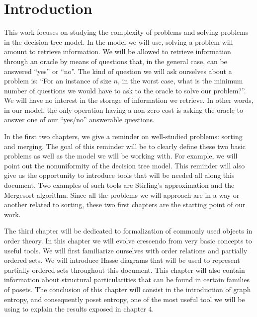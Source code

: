 \chapter*{Introduction}
%

This work focuses on studying the complexity of problems and solving problems
in the decision tree model. In the model we will use, solving a problem will
amount to retrieve information. We will be allowed to retrieve information
through an oracle by means of questions that, in the general case,
can be answered ``yes'' or ``no''. The kind of question we will ask ourselves
about a problem is: ``For an instance of size \(n\), in the worst case, what is
the minimum number of questions we would have to ask to the oracle to solve our
problem?''. We will have no interest in the storage of information we retrieve.
In other words, in our model, the only operation having a non-zero cost is
asking the oracle to answer one of our ``yes/no'' answerable questions.

In the first two chapters, we give a reminder on well-studied problems:
sorting and merging. The goal of this reminder will be to clearly define these
two basic problems as well as the model we will be working with. For example,
we will point out the nonuniformity of the decision tree model. This reminder
will also give us the opportunity to introduce tools that will be needed all along
this document. Two examples of such tools are Stirling's approximation and the
Mergesort algorithm. Since all the problems we will approach are in a way or
another related to sorting, these two first chapters are the starting point of
our work.

The third chapter will be dedicated to formalization of commonly used objects
in order theory. In this chapter we will evolve crescendo from very basic
concepts to useful tools. We will first familiarize ourselves with order
relations and partially ordered sets. We will introduce Hasse diagrams that
will be used to represent partially ordered sets throughout this document.
This chapter will also contain information about structural particularities
that can be found in certain families of posets. The conclusion of this
chapter will consist in the introduction of graph entropy, and consequently
poset entropy, one of the most useful tool we will be using to explain the
results exposed in chapter \(4\).

